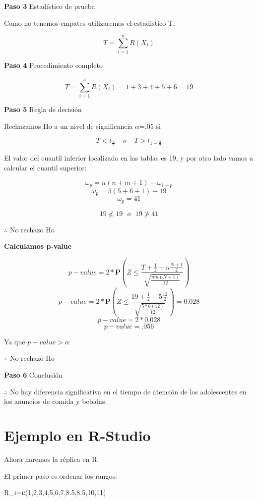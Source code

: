 \documentclass[a4paper,oneside,openany]{book}
\newenvironment{Shaded}{\begin{snugshade}}{\end{snugshade}}
\newcommand{\KeywordTok}[1]{\textcolor[rgb]{0.13,0.29,0.53}{\textbf{#1}}}
\newcommand{\DecValTok}[1]{\textcolor[rgb]{0.00,0.00,0.81}{#1}}
\newcommand{\FloatTok}[1]{\textcolor[rgb]{0.00,0.00,0.81}{#1}}
\newcommand{\NormalTok}[1]{#1}
\begin{document}
\textbf{Paso 3} Estadístico de prueba

Como no tenemos empates utilizaremos el estadistico T:

\[T=\sum_{i=1}^{n}R(X_{i})\]

\textbf{Paso 4} Procedimiento completo

\[T=\sum_{i=1}^{5}R(X_{i})= 1+3+4+5+6= 19\]

\textbf{Paso 5} Regla de decisión

Rechazamos Ho a un nivel de significancia \(\alpha\)=.05 si

\[T < t_\frac{\alpha}{2} \ \ \  \ \  o  \ \ \ \ \  T > t_{1-\frac{\alpha}{2}}\]

El valor del cuantil inferior localizado en las tablas es 19, y por otro
lado vamos a calcular el cuantil superior:

\[\omega_p= n(n+m+1)-\omega_{1-p}\] \[\omega_p= 5(5+6+1)-19\]
\[\omega_p= 41\]

\[19 \nless   19  \ \ \  o \ \ \  19 \ngtr 41\]

\(\therefore\) No rechazo Ho

\textbf{Calculamos p-value}

\[p-value = 2*\mathbf{P}\left(Z\leq\frac{T+\frac{1}{2}-n\frac{N+1}{2}}{\sqrt{\frac{nm(N+1)}{12}}}\right)\]
\[p-value = 2*\mathbf{P}\left(Z\leq\frac{19+\frac{1}{2}-5\frac{12}{2}}{\sqrt{\frac{5*6(12)}{12}}}\right)=0.028\]
\[p-value = 2*0.028\] \[p-value = .056\]

Ya que \(p-value > \alpha\)

\(\therefore\) No rechazo Ho

\textbf{Paso 6} Conclusión

\(\therefore\) No hay diferencia significativa en el tiempo de atención
de los adolescentes en los anuncios de comida y bebidas.

\section{Ejemplo en R-Studio}\label{ejemplo-en-r-studio-5}

Ahora haremos la réplica en R.

El primer paso es ordenar los rangos:

\begin{Shaded}
\begin{Highlighting}[]
\NormalTok{R_i=}\KeywordTok{c}\NormalTok{(}\DecValTok{1}\NormalTok{,}\DecValTok{2}\NormalTok{,}\DecValTok{3}\NormalTok{,}\DecValTok{4}\NormalTok{,}\DecValTok{5}\NormalTok{,}\DecValTok{6}\NormalTok{,}\DecValTok{7}\NormalTok{,}\FloatTok{8.5}\NormalTok{,}\FloatTok{8.5}\NormalTok{,}\DecValTok{10}\NormalTok{,}\DecValTok{11}\NormalTok{)}
\end{Highlighting}
\end{Shaded}
\end{document}
